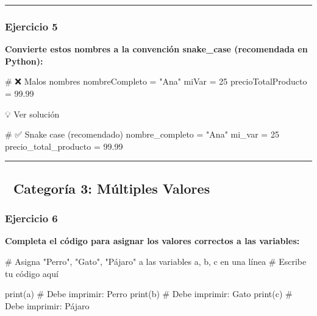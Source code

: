 \documentclass[
  doc,
  floatsintext,
  longtable,
  a4paper,
  nolmodern,
  notxfonts,
  notimes,
  12pt,
  colorlinks=true,linkcolor=blue,citecolor=blue,urlcolor=blue]{apa7}
\newenvironment{Shaded}{\begin{snugshade}}{\end{snugshade}}
\newcommand{\BuiltInTok}[1]{\textcolor[rgb]{0.00,0.23,0.31}{#1}}
\newcommand{\CommentTok}[1]{\textcolor[rgb]{0.37,0.37,0.37}{#1}}
\newcommand{\DecValTok}[1]{\textcolor[rgb]{0.68,0.00,0.00}{#1}}
\newcommand{\FloatTok}[1]{\textcolor[rgb]{0.68,0.00,0.00}{#1}}
\newcommand{\NormalTok}[1]{\textcolor[rgb]{0.00,0.23,0.31}{#1}}
\newcommand{\OperatorTok}[1]{\textcolor[rgb]{0.37,0.37,0.37}{#1}}
\newcommand{\StringTok}[1]{\textcolor[rgb]{0.13,0.47,0.30}{#1}}
\begin{document}
\begin{center}\rule{0.5\linewidth}{0.5pt}\end{center}

\subsubsection{Ejercicio 5}\label{ejercicio-5}

\textbf{Convierte estos nombres a la convención snake\_case (recomendada
en Python):}

\begin{Shaded}
\begin{Highlighting}[]
\CommentTok{\# ❌ Malos nombres}
\NormalTok{nombreCompleto }\OperatorTok{=} \StringTok{"Ana"}
\NormalTok{miVar }\OperatorTok{=} \DecValTok{25}
\NormalTok{precioTotalProducto }\OperatorTok{=} \FloatTok{99.99}
\end{Highlighting}
\end{Shaded}

💡 Ver solución

\begin{Shaded}
\begin{Highlighting}[]
\CommentTok{\# ✅ Snake case (recomendado)}
\NormalTok{nombre\_completo }\OperatorTok{=} \StringTok{"Ana"}
\NormalTok{mi\_var }\OperatorTok{=} \DecValTok{25}
\NormalTok{precio\_total\_producto }\OperatorTok{=} \FloatTok{99.99}
\end{Highlighting}
\end{Shaded}

\begin{center}\rule{0.5\linewidth}{0.5pt}\end{center}

\subsection{📌 Categoría 3: Múltiples
Valores}\label{categoruxeda-3-muxfaltiples-valores}

\subsubsection{Ejercicio 6}\label{ejercicio-6}

\textbf{Completa el código para asignar los valores correctos a las
variables:}

\begin{Shaded}
\begin{Highlighting}[]
\CommentTok{\# Asigna "Perro", "Gato", "Pájaro" a las variables a, b, c en una línea}
\CommentTok{\# Escribe tu código aquí}

\BuiltInTok{print}\NormalTok{(a)  }\CommentTok{\# Debe imprimir: Perro}
\BuiltInTok{print}\NormalTok{(b)  }\CommentTok{\# Debe imprimir: Gato}
\BuiltInTok{print}\NormalTok{(c)  }\CommentTok{\# Debe imprimir: Pájaro}
\end{Highlighting}
\end{Shaded}
\end{document}
